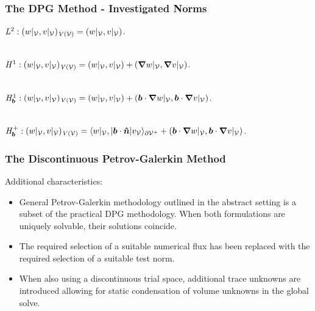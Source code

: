 \begin{frame}
\frametitle{The DPG Method - Investigated Norms}

$\mathit{{{L}}}^2: (w|_{\mathcal{{{V}}}},v|_{\mathcal{{{V}}}})_{\mathit{{{V}}}(\mathcal{{{V}}})}
  = (w|_{\mathcal{{{V}}}},v|_{\mathcal{{{V}}}}) $.
\\~

$\fspace{H}^1: (w|_{\fe{V}},v|_{\fe{V}})_{\fspace{V}(\fe{V})}
  = (w|_{\fe{V}},v|_{\fe{V}}) +(\nabla w|_{\fe{V}},\nabla v|_{\fe{V}})$.
\\~

$\fspace{H}^1_\varv{b}: (w|_{\fe{V}},v|_{\fe{V}})_{\fspace{V}(\fe{V})}
  = (w|_{\fe{V}},v|_{\fe{V}}) +(\varv{b} \cdot \nabla w|_{\fe{V}},\varv{b} \cdot \nabla v|_{\fe{V}})$.
\\~

$\fspace{H}^+_\varv{b}: (w|_{\fe{V}},v|_{\fe{V}})_{\fspace{V}(\fe{V})} =
  \langle w|_{\fe{V}},|\varv{b} \cdot \varv{\hat{n}}| v_{\fe{V}} \rangle_{\partial \fe{V}^+} +(\varv{b} \cdot \nabla w|_{\fe{V}},\varv{b} \cdot \nabla v|_{\fe{V}})$.

\end{frame}

\begin{frame}
\frametitle{The Discontinuous Petrov-Galerkin Method}

Additional characteristics:
\begin{itemize}
  \item General Petrov-Galerkin methodology outlined in the abstract setting is
    a subset of the practical DPG methodology. When both formulations are
    uniquely solvable, their solutions coincide.
  \item The required selection of a suitable numerical flux has been replaced
    with the required selection of a suitable test norm.
  \item When also using a discontinuous trial space, additional trace unknowns
    are introduced allowing for static condensation of volume unknowns in the
    global solve.
\end{itemize}

\end{frame}
